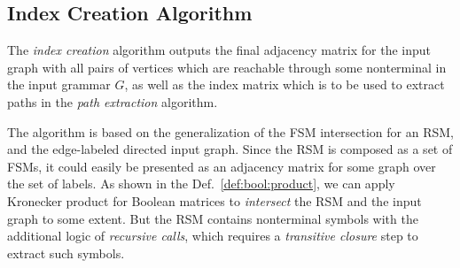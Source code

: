 \subsection{Index Creation Algorithm}

The \textit{index creation} algorithm outputs the final adjacency matrix for the input graph with all pairs of vertices which are reachable through some nonterminal in the input grammar $G$, as well as the index matrix which is to be used to extract paths in the \textit{path extraction} algorithm.

The algorithm is based on the generalization of the FSM intersection for an RSM,  and the edge-labeled directed input graph.
Since the RSM is composed as a set of FSMs, it could easily be presented as an adjacency matrix for some graph over the set of labels.
As shown in the Def.~\ref{def:bool:product}, we can apply Kronecker product for Boolean matrices to \textit{intersect} the RSM and the input graph to some extent.
But the RSM contains nonterminal symbols with the additional logic of \textit{recursive calls}, which requires a \textit{transitive closure} step to extract such symbols.

